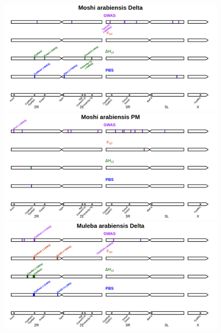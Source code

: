 \documentclass[a4paper,12pt]{article}
\begin{document}
\begin{figure}[h]
	\hspace{2cm}\includegraphics*[width = 13cm]{../supplementary_implicated_regions/Moshi_arabiensis_Delta_implicated_regions.png}
	\vskip 0.5cm
	\hspace{2cm}\includegraphics*[width = 13cm]{../supplementary_implicated_regions/Moshi_arabiensis_PM_implicated_regions.png}
	\vskip 0.5cm
	\hspace{2cm}\includegraphics*[width = 13cm]{../supplementary_implicated_regions/Muleba_arabiensis_Delta_implicated_regions.png}

\end{figure}
\end{document}
